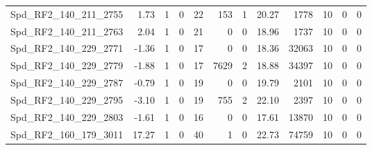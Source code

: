 \begin{longtable}[c]{@{}lrrrrrrrrrrr@{}}
Spd\_RF2\_140\_211\_2755     & 1.73                   & 1                       & 0                       & 22                     & 153                     & 1                       & 20.27                   & 1778                     & 10                       & 0                        & 0                        \\
Spd\_RF2\_140\_211\_2763     & 2.04                   & 1                       & 0                       & 21                     & 0                       & 0                       & 18.96                   & 1737                     & 10                       & 0                        & 0                        \\
Spd\_RF2\_140\_229\_2771     & -1.36                  & 1                       & 0                       & 17                     & 0                       & 0                       & 18.36                   & 32063                    & 10                       & 0                        & 0                        \\
Spd\_RF2\_140\_229\_2779     & -1.88                  & 1                       & 0                       & 17                     & 7629                    & 2                       & 18.88                   & 34397                    & 10                       & 0                        & 0                        \\
Spd\_RF2\_140\_229\_2787     & -0.79                  & 1                       & 0                       & 19                     & 0                       & 0                       & 19.79                   & 2101                     & 10                       & 0                        & 0                        \\
Spd\_RF2\_140\_229\_2795     & -3.10                  & 1                       & 0                       & 19                     & 755                     & 2                       & 22.10                   & 2397                     & 10                       & 0                        & 0                        \\
Spd\_RF2\_140\_229\_2803     & -1.61                  & 1                       & 0                       & 16                     & 0                       & 0                       & 17.61                   & 13870                    & 10                       & 0                        & 0                        \\
Spd\_RF2\_160\_179\_3011     & 17.27                  & 1                       & 0                       & 40                     & 1                       & 0                       & 22.73                   & 74759                    & 10                       & 0                        & 0                        \\

\end{longtable}
